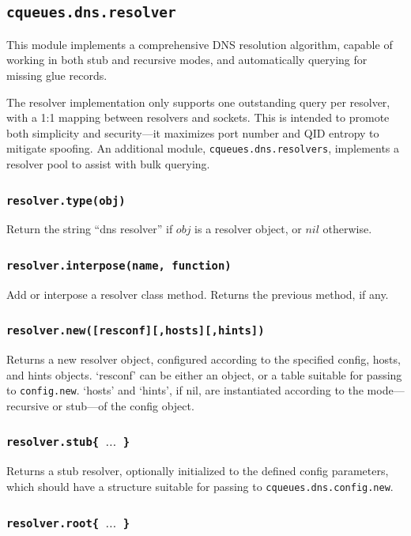 \documentclass[11pt, oneside]{memoir}
\newcommand*{\routine}[1]{\texttt{#1}\xspace}
\newcommand*{\fn}[1]{\texttt{#1}\xspace}
\newcommand*{\module}[1]{\texttt{#1}\xspace}
\newcounter{toccols}
\newenvironment{Module}[1]{
	\subsection{\texttt{#1}}
	\addtocontents{toc}{
		\protect\begin{multicols}{\value{toccols}}
	}
}{
	\addtocontents{toc}{\protect\end{multicols}}
}
\begin{document}
\begin{Module}{cqueues.dns.resolver}

This module implements a comprehensive DNS resolution algorithm, capable of working in both stub and recursive modes, and automatically querying for missing glue records.

The resolver implementation only supports one outstanding query per resolver, with a 1:1 mapping between resolvers and sockets. This is intended to promote both simplicity and security---it maximizes port number and QID entropy to mitigate spoofing. An additional module, \module{cqueues.dns.resolvers}, implements a resolver pool to assist with bulk querying.

\subsubsection[\routine{resolver.type}]{\routine{resolver.type(obj)}}
Return the string ``dns resolver'' if $obj$ is a resolver object, or $nil$ otherwise.

\subsubsection[\fn{resolver.interpose}]{\fn{resolver.interpose(name, function)}}

Add or interpose a resolver class method. Returns the previous method, if any.

\subsubsection[\fn{resolver.new}]{\fn{resolver.new([resconf][,hosts][,hints])}}

Returns a new resolver object, configured according to the specified config, hosts, and hints objects. `resconf' can be either an object, or a table suitable for passing to \fn{config.new}. `hosts' and `hints', if nil, are instantiated according to the mode---recursive or stub---of the config object.

\subsubsection[\fn{resolver.stub}]{\fn{resolver.stub\{ $\ldots$ \}}}

Returns a stub resolver, optionally initialized to the defined config parameters, which should have a structure suitable for passing to \fn{cqueues.dns.config.new}.

\subsubsection[\fn{resolver.root}]{\fn{resolver.root\{ $\ldots$ \}}}


\end{Module}
\end{document}
